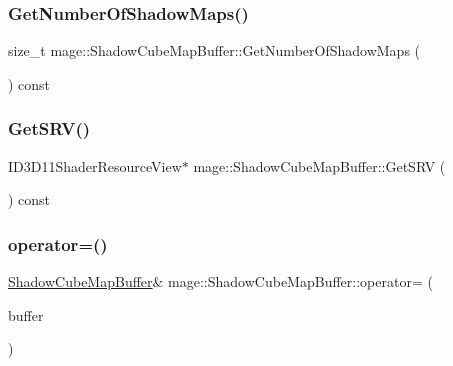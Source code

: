 \hypertarget{structmage_1_1_shadow_cube_map_buffer_a90dd93ff618bc56750bd08cfe6979c23}{}\label{structmage_1_1_shadow_cube_map_buffer_a90dd93ff618bc56750bd08cfe6979c23} 
\subsubsection{\texorpdfstring{Get\+Number\+Of\+Shadow\+Maps()}{GetNumberOfShadowMaps()}}
{\footnotesize\ttfamily size\+\_\+t mage\+::\+Shadow\+Cube\+Map\+Buffer\+::\+Get\+Number\+Of\+Shadow\+Maps (\begin{DoxyParamCaption}{ }\end{DoxyParamCaption}) const\hspace{0.3cm}{\ttfamily [noexcept]}}

\hypertarget{structmage_1_1_shadow_cube_map_buffer_ae1a6d1a26d482d6d145505b3b63bdb8d}{}\label{structmage_1_1_shadow_cube_map_buffer_ae1a6d1a26d482d6d145505b3b63bdb8d} 
\subsubsection{\texorpdfstring{Get\+S\+R\+V()}{GetSRV()}}
{\footnotesize\ttfamily I\+D3\+D11\+Shader\+Resource\+View$\ast$ mage\+::\+Shadow\+Cube\+Map\+Buffer\+::\+Get\+S\+RV (\begin{DoxyParamCaption}{ }\end{DoxyParamCaption}) const\hspace{0.3cm}{\ttfamily [noexcept]}}

\hypertarget{structmage_1_1_shadow_cube_map_buffer_abdb46d337840a5ffd76f12472d520eff}{}\label{structmage_1_1_shadow_cube_map_buffer_abdb46d337840a5ffd76f12472d520eff} 
\subsubsection{\texorpdfstring{operator=()}{operator=()}\hspace{0.1cm}{\footnotesize\ttfamily [1/2]}}
{\footnotesize\ttfamily \hyperlink{structmage_1_1_shadow_cube_map_buffer}{Shadow\+Cube\+Map\+Buffer}\& mage\+::\+Shadow\+Cube\+Map\+Buffer\+::operator= (\begin{DoxyParamCaption}\item[{const \hyperlink{structmage_1_1_shadow_cube_map_buffer}{Shadow\+Cube\+Map\+Buffer} \&}]{buffer }\end{DoxyParamCaption})\hspace{0.3cm}{\ttfamily [delete]}}

